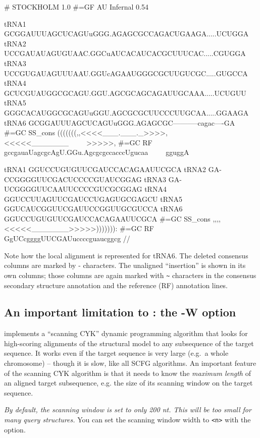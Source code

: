 \begin{sreoutput}
# STOCKHOLM 1.0
#=GF AU    Infernal 0.54

tRNA1             GCGGAUUUAGCUCAGUuGGG.AGAGCGCCAGACUGAAGA.....UCUGGA
tRNA2             UCCGAUAUAGUGUAAC.GGCuAUCACAUCACGCUUUCAC.....CGUGGA
tRNA3             UCCGUGAUAGUUUAAU.GGUcAGAAUGGGCGCUUGUCGC.....GUGCCA
tRNA4             GCUCGUAUGGCGCAGU.GGU.AGCGCAGCAGAUUGCAAA.....UCUGUU
tRNA5             GGGCACAUGGCGCAGUuGGU.AGCGCGCUUCCCUUGCAA.....GGAAGA
tRNA6             GCGGAUUUAGCUCAGUuGGG.AGAGCGC-----------cagac----GA
#=GC SS_cons      (((((((,,<<<<___.___._>>>>,<<<<<_______~~~~~>>>>>,
#=GC RF           gccgauaUagcgcAgU.GGu.AgcgcgccacccUgucaa~~~~~gguggA

tRNA1             GGUCCUGUGUUCGAUCCACAGAAUUCGCA
tRNA2             GA-CCGGGGUUCGACUCCCCGUAUCGGAG
tRNA3             GA-UCGGGGUUCAAUUCCCCGUCGCGGAG
tRNA4             GGUCCUUAGUUCGAUCCUGAGUGCGAGCU
tRNA5             GGUCAUCGGUUCGAUUCCGGUUGCGUCCA
tRNA6             GGUCCUGUGUUCGAUCCACAGAAUUCGCA
#=GC SS_cons      ,,,,<<<<<_______>>>>>))))))):
#=GC RF           GgUCcggggUUCGAUuccccguaucggcg
//
\end{sreoutput}

Note how the local alignment is represented for tRNA6. The deleted
consensus columns are marked by - characters. The unaligned
``insertion'' is shown in its own columns; those columns are again
marked with \verb+~+ characters in the consensus secondary structure
annotation and the reference (RF) annotation lines.

\subsection{An important limitation to : the -W option}

 implements a ``scanning CYK'' dynamic programming
algorithm \cite{Durbin98} that looks for high-scoring alignments of
the structural model to any subsequence of the target sequence. It
works even if the target sequence is very large (e.g.\ a whole
chromosome) -- though it is slow, like all SCFG algorithms. An
important feature of the scanning CYK algorithm is that it needs to
know the \emph{maximum length} of an aligned target subsequence, e.g.
the size of its scanning window on the target sequence.

\emph{By default, the scanning window is set to only 200 nt. This will
be too small for many query structures.} You can set the scanning
window width to \verb+<n>+ with the  option. 

